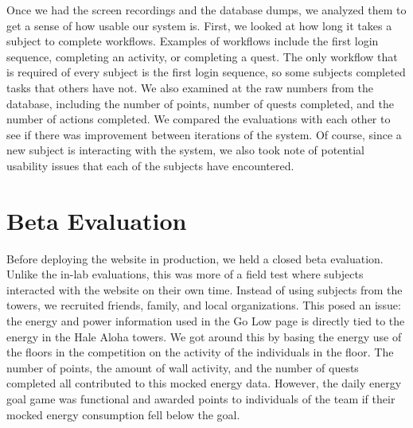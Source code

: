 Once we had the screen recordings and the database dumps, we analyzed them to get a sense of how usable our system is. First, we looked at how long it takes a subject to complete workflows. Examples of workflows include the first login sequence, completing an activity, or completing a quest. The only workflow that is required of every subject is the first login sequence, so some subjects completed tasks that others have not. We also examined at the raw numbers from the database, including the number of points, number of quests completed, and the number of actions completed. We compared the evaluations with each other to see if there was improvement between iterations of the system. Of course, since a new subject is interacting with the system, we also took note of potential usability issues that each of the subjects have encountered. 

% 

\section{Beta Evaluation}

Before deploying the website in production, we held a closed beta evaluation. Unlike the in-lab evaluations, this was more of a field test where subjects interacted with the website on their own time. Instead of using subjects from the towers, we recruited friends, family, and local organizations. This posed an issue: the energy and power information used in the Go Low page is directly tied to the energy in the Hale Aloha towers. We got around this by basing the energy use of the floors in the competition on the activity of the individuals in the floor. The number of points, the amount of wall activity, and the number of quests completed all contributed to this mocked energy data. However, the daily energy goal game was functional and awarded points to individuals of the team if their mocked energy consumption fell below the goal.

